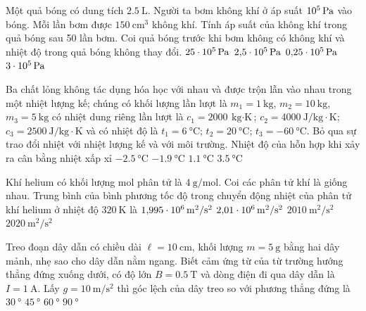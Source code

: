 \begin{ex}
Một quả bóng có dung tích $\SI{2.5}{\liter}$. Người ta bơm không khí ở áp suất $\SI{E5}{\pascal}$ vào bóng. Mỗi lần bơm được $\SI{150}{\centi\meter^3}$ không khí. Tính áp suất của không khí trong quả bóng sau 50 lần bơm. Coi quả bóng trước khi bơm không có không khí và nhiệt độ trong quả bóng không thay đổi.
	\choice
	{$\SI{25E5}{\pascal}$}
	{$\SI{2.5E5}{\pascal}$}
	{$\SI{0.25E5}{\pascal}$}
	{$\SI{3E5}{\pascal}$}
	\loigiai{}
\end{ex}
\begin{ex}
	Ba chất lỏng không tác dụng hóa học với nhau và được trộn lẫn vào nhau trong một nhiệt lượng kế; chúng có khối lượng lần lượt là $m_1=\SI{1}{\kilogram}$, $m_2=\SI{10}{\kilogram}$, $m_3=\SI{5}{\kilogram}$ có nhiệt dung riêng lần lượt là $c_1=\SI{2000}{\kilogram\cdot\kelvin}$; $c_2=\SI{4000}{\joule/\kilogram\cdot\kelvin}$; $c_3=\SI{2500}{\joule/\kilogram\cdot\kelvin}$ và có nhiệt độ là $t_1=\SI{6}{\celsius}$; $t_2=\SI{20}{\celsius}$; $t_3=\SI{-60}{\celsius}$. Bỏ qua sự trao đổi nhiệt với nhiệt lượng kế và với môi trường. Nhiệt độ của hỗn hợp khi xảy ra cân bằng nhiệt xấp xỉ
	\choice
	{$\SI{-2.5}{\celsius}$}
	{$\SI{-1.9}{\celsius}$}
	{$\SI{1.1}{\celsius}$}
	{$\SI{3.5}{\celsius}$}
	\loigiai{}
\end{ex}
\begin{ex}
	Khí helium có khối lượng mol phân tử là $\SI{4}{\gram/\mole}$. Coi các phân tử khí là giống nhau. Trung bình của bình phương tốc độ trong chuyển động nhiệt của phân tử khí helium ở nhiệt độ $\SI{320}{\kelvin}$ là
	\choice
	{$\SI{1.995E6}{\meter^2/\second^2}$}
	{$\SI{2.01E6}{\meter^2/\second^2}$}
	{$\SI{2010}{\meter^2/\second^2}$}
	{$\SI{2020}{\meter^2/\second^2}$}
	\loigiai{}
\end{ex}
\begin{ex}
	Treo đoạn dây dẫn có chiều dài $\ell=\SI{10}{\centi\meter}$, khối lượng $m=\SI{5}{\gram}$ bằng hai dây mảnh, nhẹ sao cho dây dẫn nằm ngang. Biết cảm ứng từ của từ trường hướng thẳng đứng xuống dưới, có độ lớn $B=\SI{0.5}{\tesla}$ và dòng điện đi qua dây dẫn là $I=\SI{1}{\ampere}$. Lấy $g=\SI{10}{\meter/\second^2}$ thì góc lệch của dây treo so với phương thẳng đứng là
	\choice
	{$\SI{30}{\degree}$}
	{$\SI{45}{\degree}$}
	{$\SI{60}{\degree}$}
	{$\SI{90}{\degree}$}
	\loigiai{}
\end{ex}
